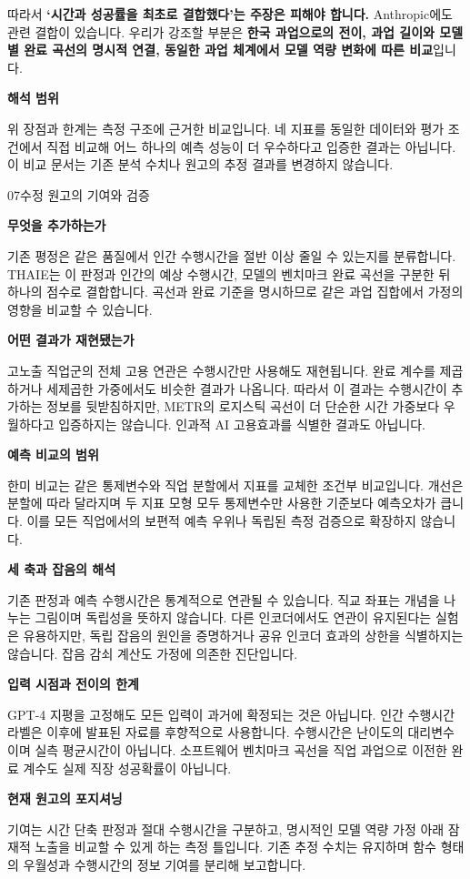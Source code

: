\documentclass[11pt,a4paper]{article}
\newcommand{\pagetitle}[2]{{\small\sffamily\color{ink}#1\par}\vspace{3mm}{\LARGE\bfseries #2\par}\vspace{4mm}}
\begin{document}
따라서 \textbf{‘시간과 성공률을 최초로 결합했다’는 주장은 피해야 합니다.} Anthropic에도 관련 결합이 있습니다. 우리가 강조할 부분은 \textbf{한국 과업으로의 전이, 과업 길이와 모델별 완료 곡선의 명시적 연결, 동일한 과업 체계에서 모델 역량 변화에 따른 비교}입니다.

\textbf{해석 범위}\par
위 장점과 한계는 측정 구조에 근거한 비교입니다. 네 지표를 동일한 데이터와 평가 조건에서 직접 비교해 어느 하나의 예측 성능이 더 우수하다고 입증한 결과는 아닙니다. 이 비교 문서는 기존 분석 수치나 원고의 추정 결과를 변경하지 않습니다.

\newpage
\pagetitle{07\quad 수정 원고의 기여와 검증}{수행시간의 정보와 함수 선택을 구분하기}
\textbf{무엇을 추가하는가}\par
기존 평정은 같은 품질에서 인간 수행시간을 절반 이상 줄일 수 있는지를 분류합니다. THAIE는 이 판정과 인간의 예상 수행시간, 모델의 벤치마크 완료 곡선을 구분한 뒤 하나의 점수로 결합합니다. 곡선과 완료 기준을 명시하므로 같은 과업 집합에서 가정의 영향을 비교할 수 있습니다.

\textbf{어떤 결과가 재현됐는가}\par
고노출 직업군의 전체 고용 연관은 수행시간만 사용해도 재현됩니다. 완료 계수를 제곱하거나 세제곱한 가중에서도 비슷한 결과가 나옵니다. 따라서 이 결과는 수행시간이 추가하는 정보를 뒷받침하지만, METR의 로지스틱 곡선이 더 단순한 시간 가중보다 우월하다고 입증하지는 않습니다. 인과적 AI 고용효과를 식별한 결과도 아닙니다.

\textbf{예측 비교의 범위}\par
한미 비교는 같은 통제변수와 직업 분할에서 지표를 교체한 조건부 비교입니다. 개선은 분할에 따라 달라지며 두 지표 모형 모두 통제변수만 사용한 기준보다 예측오차가 큽니다. 이를 모든 직업에서의 보편적 예측 우위나 독립된 측정 검증으로 확장하지 않습니다.

\textbf{세 축과 잡음의 해석}\par
기존 판정과 예측 수행시간은 통계적으로 연관될 수 있습니다. 직교 좌표는 개념을 나누는 그림이며 독립성을 뜻하지 않습니다. 다른 인코더에서도 연관이 유지된다는 실험은 유용하지만, 독립 잡음의 원인을 증명하거나 공유 인코더 효과의 상한을 식별하지는 않습니다. 잡음 감쇠 계산도 가정에 의존한 진단입니다.

\textbf{입력 시점과 전이의 한계}\par
GPT-4 지평을 고정해도 모든 입력이 과거에 확정되는 것은 아닙니다. 인간 수행시간 라벨은 이후에 발표된 자료를 후향적으로 사용합니다. 수행시간은 난이도의 대리변수이며 실측 평균시간이 아닙니다. 소프트웨어 벤치마크 곡선을 직업 과업으로 이전한 완료 계수도 실제 직장 성공확률이 아닙니다.

\textbf{현재 원고의 포지셔닝}\par
기여는 시간 단축 판정과 절대 수행시간을 구분하고, 명시적인 모델 역량 가정 아래 잠재적 노출을 비교할 수 있게 하는 측정 틀입니다. 기존 추정 수치는 유지하며 함수 형태의 우월성과 수행시간의 정보 기여를 분리해 보고합니다.
\end{document}
